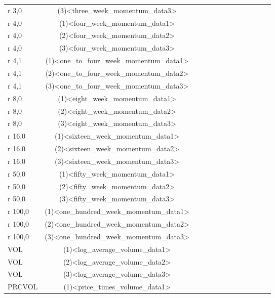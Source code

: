 \documentclass{article}
\begin{document}
{\begin{tiny}
\begin{tabular}{lcccccccccccr}
                r 3,0 & (3)<three_week_momentum_data3>
                \\
                r 4,0 & (1)<four_week_momentum_data1>
                \\
                r 4,0 & (2)<four_week_momentum_data2>
                \\
                r 4,0 & (3)<four_week_momentum_data3>
                \\
                r 4,1 & (1)<one_to_four_week_momentum_data1>
                \\
                r 4,1 & (2)<one_to_four_week_momentum_data2>
                \\
                r 4,1 & (3)<one_to_four_week_momentum_data3>
                \\
                r 8,0 & (1)<eight_week_momentum_data1>
                \\
                r 8,0 & (2)<eight_week_momentum_data2>
                \\
                r 8,0 & (3)<eight_week_momentum_data3>
                \\
                r 16,0 & (1)<sixteen_week_momentum_data1>
                \\
                r 16,0 & (2)<sixteen_week_momentum_data2>
                \\
                r 16,0 & (3)<sixteen_week_momentum_data3>
                \\
                r 50,0 & (1)<fifty_week_momentum_data1>
                \\
                r 50,0 & (2)<fifty_week_momentum_data2>
                \\
                r 50,0 & (3)<fifty_week_momentum_data3>
                \\
                r 100,0 & (1)<one_hundred_week_momentum_data1>
                \\
                r 100,0 & (2)<one_hundred_week_momentum_data2>
                \\
                r 100,0 & (3)<one_hundred_week_momentum_data3>
                \\
                VOL & (1)<log_average_volume_data1>
                \\
                VOL & (2)<log_average_volume_data2>
                \\
                VOL & (3)<log_average_volume_data3>
                \\
                PRCVOL & (1)<price_times_volume_data1>

\end{tabular}
\end{tiny}}
\end{document}
